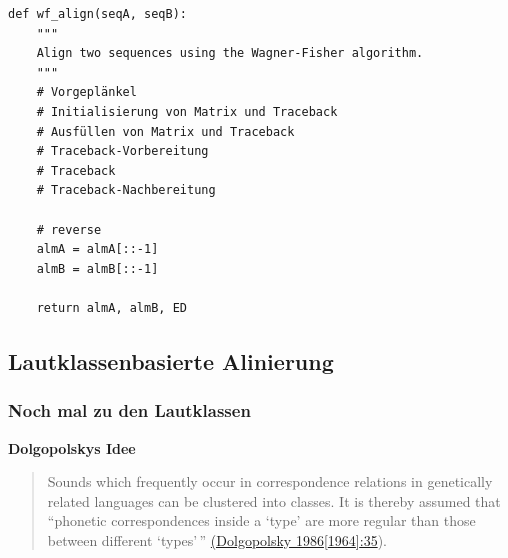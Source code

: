 \begin{verbatim}
def wf_align(seqA, seqB):
    """
    Align two sequences using the Wagner-Fisher algorithm.
    """
    # Vorgeplänkel
    # Initialisierung von Matrix und Traceback
    # Ausfüllen von Matrix und Traceback
    # Traceback-Vorbereitung
    # Traceback
    # Traceback-Nachbereitung

    # reverse
    almA = almA[::-1]
    almB = almB[::-1]

    return almA, almB, ED
\end{verbatim}

\subsection{Lautklassenbasierte Alinierung}

\subsubsection{\texorpdfstring{{Noch mal zu den
Lautklassen}}{Noch mal zu den Lautklassen}}

\vspace{0.5cm}\par\noindent\textbf{Dolgopolskys Idee}\vspace{0.5cm}

\begin{quote}
Sounds which frequently occur in correspondence relations in genetically
related languages can be clustered into classes. It is thereby assumed
that ``phonetic correspondences inside a `type' are more regular than
those between different `types'\,''
\href{http://bibliography.lingpy.org?key=Dolgopolsky1986}{(Dolgopolsky
1986{[}1964{]}:35}).
\end{quote}





